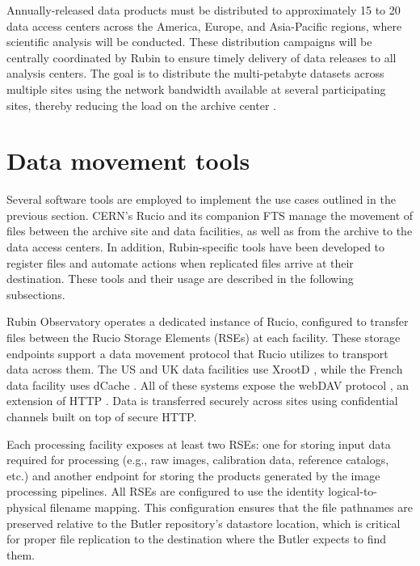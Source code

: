\documentclass{webofc}
\begin{document}
Annually-released data products must be distributed to approximately 15 to 20 data access centers across the America, Europe, and Asia-Pacific regions, where scientific analysis will be conducted. These distribution campaigns will be centrally coordinated by Rubin to ensure timely delivery of data releases to all analysis centers. The goal is to distribute the multi-petabyte datasets across multiple sites using the network bandwidth available at several participating sites, thereby reducing the load on the archive center \cite{RTN-086}.

\section{Data movement tools}
\label{section-data-movement-tools}

Several software tools are employed to implement the use cases outlined in the previous section. CERN's Rucio \cite{rucio2019} and its companion FTS \cite{FTS} manage the movement of files between the archive site and data facilities, as well as from the archive to the data access centers. In addition, Rubin-specific tools have been developed to register files and automate actions when replicated files arrive at their destination. These tools and their usage are described in the following subsections.

Rubin Observatory operates a dedicated instance of Rucio, configured to transfer files between the Rucio Storage Elements (RSEs) at each facility. These storage endpoints support a data movement protocol that Rucio utilizes to transport data across them. The US and UK data facilities use XrootD \cite{xrootd}, while the French data facility uses dCache \cite{dCache}. All of these systems expose the webDAV protocol \cite{webdav}, an extension of HTTP \cite{http1.1}. Data is transferred securely across sites using confidential channels built on top of secure HTTP.

Each processing facility exposes at least two RSEs: one for storing input data required for processing (e.g., raw images, calibration data, reference catalogs, etc.) and another endpoint for storing the products generated by the image processing pipelines. All RSEs are configured to use the identity logical-to-physical filename mapping. This configuration ensures that the file pathnames are preserved relative to the Butler repository's datastore location, which is critical for proper file replication to the destination where the Butler expects to find them.
\end{document}
